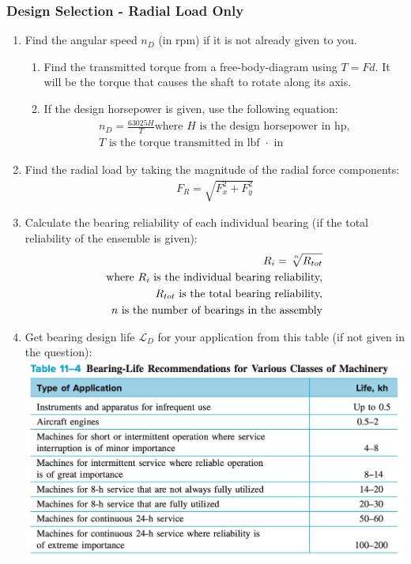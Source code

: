\documentclass[11pt, fleqn]{article}
\begin{document}
\subsubsection{Design Selection - Radial Load Only}
\begin{enumerate}
    \item Find the angular speed $n_D$ (in rpm) if it is not already given to you.
    \begin{enumerate}
        \item Find the transmitted torque from a free-body-diagram using $T=Fd$. It will be the torque that causes the shaft to rotate along its axis.
        \item If the design horsepower is given, use the following equation:
        \begin{align*}
            n_D = \frac{63 025 H}{T}
            \text{where $H$ is the design horsepower in hp,}\\
            \text{$T$ is the torque transmitted in lbf $\cdot$ in}
        \end{align*}
    \end{enumerate}
    \item Find the radial load by taking the magnitude of the radial force components:
    \begin{align*}
        F_R = \sqrt{F_x^2+F_y^2}
    \end{align*}
    \item Calculate the bearing reliability of each individual bearing (if the total reliability of the ensemble is given):
    \begin{align*}
        R_i = \sqrt[\leftroot{-2}\uproot{2}n]{R_{tot}}\\
        \text{where $R_i$ is the individual bearing reliability,}\\
        \text{$R_{tot}$ is the total bearing reliability,}\\
        \text{$n$ is the number of bearings in the assembly}
    \end{align*}
    \item Get bearing design life $\mathscr{L}_D$ for your application from this table (if not given in the question):\\
    \includegraphics[scale=0.5]{Bearings/bearing-life.png}

\end{enumerate}
\end{document}
